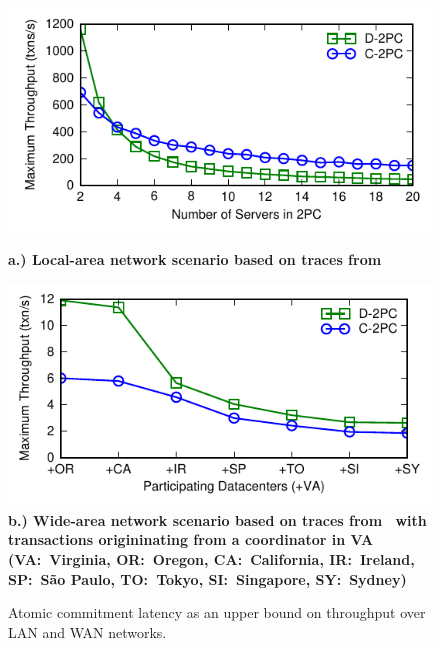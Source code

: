 \begin{figure}
  \includegraphics[width=\columnwidth]{figs/singledc-twopc.pdf}\\ {\centering
    \textbf{\scriptsize a.) Local-area network scenario based on
      traces from~\cite{bobtail}}\par}
  \includegraphics[width=\columnwidth]{figs/multidc-twopc.pdf}\\ \textbf{\scriptsize
    b.) Wide-area network scenario based on traces
    from~\cite{hat-vldb} with transactions origininating from a
    coordinator in VA (VA:~Virginia, OR:~Oregon, CA:~California,
    IR:~Ireland, SP:~S\~{a}o Paulo, TO:~Tokyo, SI:~Singapore,
    SY:~Sydney)}

\caption{Atomic commitment latency as an upper bound on throughput
  over LAN and WAN networks.}
\label{fig:2pc}
\end{figure}

